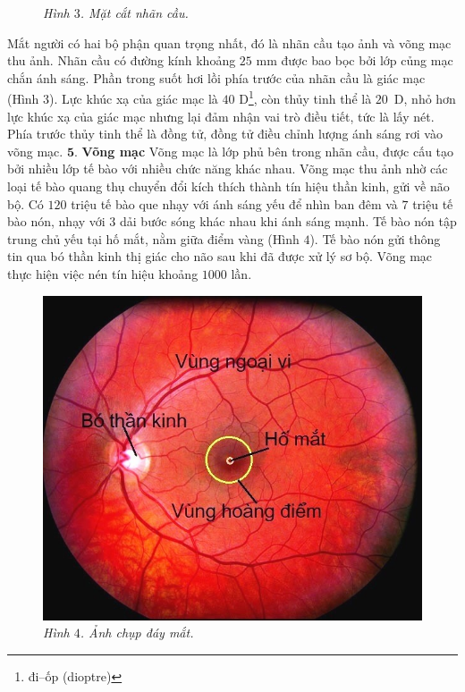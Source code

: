 \begin{multicols}{2}
\begin{figure}[H]
		\caption{\small\textit{\color{timhieukhoahoc}Hình $3$. Mặt cắt nhãn cầu.}}
		\vspace*{-10pt}
	\end{figure}
	Mắt người có hai bộ phận quan trọng nhất, đó là nhãn cầu tạo ảnh và võng mạc thu ảnh. Nhãn cầu có đường kính khoảng $25$ mm được bao bọc bởi lớp củng mạc chắn ánh sáng. Phần trong suốt hơi lồi phía trước của nhãn cầu là giác mạc (Hình $3$). Lực khúc xạ của giác mạc là $40$ D\footnote[3]{\color{timhieukhoahoc}đi--ốp (dioptre)}, còn thủy tinh thể là $20$~D, nhỏ hơn lực khúc xạ của giác mạc nhưng lại đảm nhận vai trò điều tiết, tức là lấy nét. Phía trước thủy tinh thể là đồng tử, đồng tử điều chỉnh lượng ánh sáng rơi vào võng mạc.
	\vskip 0.1cm
	$\pmb{5.}$ \textbf{\color{timhieukhoahoc}Võng mạc}
	\vskip 0.1cm
	Võng mạc là lớp phủ bên trong nhãn cầu, được cấu tạo bởi nhiều lớp tế bào với nhiều chức năng khác nhau. Võng mạc thu ảnh nhờ các loại tế bào quang thụ chuyển đổi kích thích thành tín hiệu thần kinh, gửi về não bộ. Có $120$ triệu tế bào que nhạy với ánh sáng yếu để nhìn ban đêm và $7$ triệu tế bào nón, nhạy với $3$ dải bước sóng khác nhau khi ánh sáng mạnh. Tế bào nón tập trung chủ yếu tại hố mắt, nằm giữa điểm vàng (Hình $4$). Tế bào nón gửi thông tin qua bó thần kinh thị giác cho não sau khi đã được xử lý sơ bộ. Võng mạc thực hiện việc nén tín hiệu khoảng $1000$ lần.
	\begin{figure}[H]
		\vspace*{-5pt}
		\centering
		\captionsetup{labelformat= empty, justification=centering}
		\includegraphics[width= 0.75\linewidth]{4}
		\caption{\small\textit{\color{timhieukhoahoc}Hình $4$. Ảnh chụp đáy mắt.}}
		\vspace*{-10pt}
	\end{figure}

\end{multicols}
